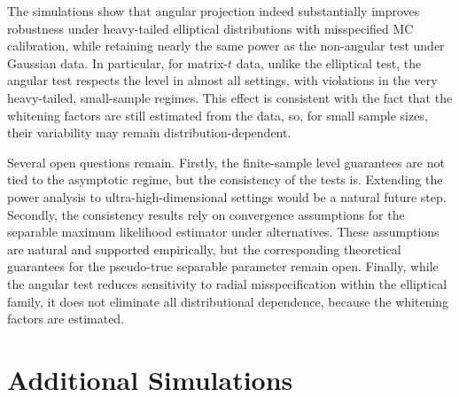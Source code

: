 \documentclass[12pt]{article}
\begin{document}
The simulations show that angular projection indeed substantially improves robustness under heavy-tailed elliptical distributions with misspecified MC calibration, while retaining nearly the same power as the non-angular test under Gaussian data. In particular, for matrix-$t$ data, unlike the elliptical test, the angular test respects the level in almost all settings, with violations in the very heavy-tailed, small-sample regimes. This effect is consistent with the fact that the whitening factors are still estimated from the data, so, for small sample sizes, their variability may remain distribution-dependent. 

Several open questions remain.
Firstly, the finite-sample level guarantees are not tied to the asymptotic regime, but the consistency of the tests is. Extending the power analysis to ultra-high-dimensional settings would be a natural future step. Secondly, the consistency results rely on convergence assumptions for the separable maximum likelihood estimator under alternatives. These assumptions are natural and supported empirically, but the corresponding theoretical guarantees for the pseudo-true separable parameter remain open. Finally, while the angular test reduces sensitivity to radial misspecification within the elliptical family, it does not eliminate all distributional dependence, because the whitening factors are estimated.%


\newpage

























\appendix
\renewcommand{\thesection}{\Alph{section}}
\makeatletter
\def\@seccntformat#1{\ifcsname AppPrefix@#1\endcsname\csname AppPrefix@#1\endcsname\else\csname the#1\endcsname\quad\fi}
\newcommand\AppPrefix@section{Appendix \thesection\quad}
\makeatother

\section{Additional Simulations} \label{appendix:sim}
\end{document}
